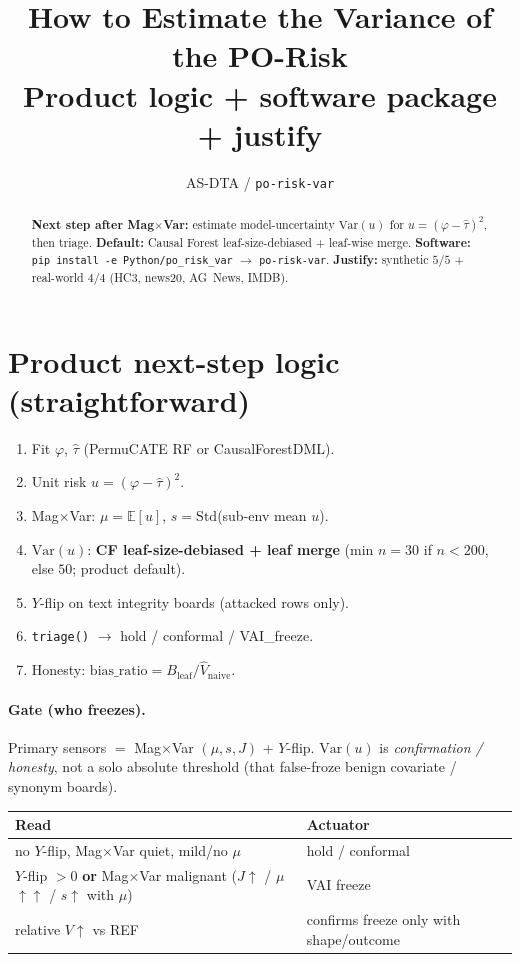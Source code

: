 \documentclass[11pt]{article}
\title{How to Estimate the Variance of the PO-Risk\\
\large Product logic + software package + justify}
\author{AS-DTA / \texttt{po-risk-var}}
\date{}
\begin{document}
\maketitle

\begin{abstract}
\noindent
\textbf{Next step after Mag$\times$Var:} estimate model-uncertainty
$\mathrm{Var}(u)$ for $u=(\varphi-\hat\tau)^2$, then triage.
\textbf{Default:} Causal Forest leaf-size-debiased + leaf-wise merge.
\textbf{Software:} \texttt{pip install -e Python/po\_risk\_var} $\to$
\texttt{po-risk-var}.
\textbf{Justify:} synthetic $5/5$ + real-world $4/4$ (HC3, news20, AG~News, IMDB).
\end{abstract}

\section{Product next-step logic (straightforward)}

\begin{enumerate}[leftmargin=1.3em,itemsep=0.35em]
  \item Fit $\varphi$, $\hat\tau$ (PermuCATE RF or CausalForestDML).
  \item Unit risk $u=(\varphi-\hat\tau)^2$.
  \item Mag$\times$Var: $\mu=\mathbb{E}[u]$, $s=\mathrm{Std}$(sub-env mean $u$).
  \item $\mathrm{Var}(u)$: \textbf{CF leaf-size-debiased + leaf merge}
        (min $n{=}30$ if $n{<}200$, else $50$; product default).
  \item $Y$-flip on text integrity boards (attacked rows only).
  \item \texttt{triage()} $\to$ hold / conformal / VAI\_freeze.
  \item Honesty: $\mathrm{bias\_ratio}=B_{\mathrm{leaf}}/\widehat V_{\mathrm{naive}}$.
\end{enumerate}

\paragraph{Gate (who freezes).}
Primary sensors $=$ Mag$\times$Var $(\mu,s,J)$ + $Y$-flip.
$\mathrm{Var}(u)$ is \emph{confirmation / honesty}, not a solo absolute
threshold (that false-froze benign covariate / synonym boards).
\begin{center}
\small
\begin{tabular}{@{}ll@{}}
\toprule
Read & Actuator \\
\midrule
no $Y$-flip, Mag$\times$Var quiet, mild/no $\mu$ & hold / conformal \\
$Y$-flip $>0$ \textbf{or} Mag$\times$Var malignant
  ($J$$\uparrow$ / $\mu$$\uparrow$$\uparrow$ / $s$$\uparrow$ with $\mu$) & VAI freeze \\
relative $V$$\uparrow$ vs REF & confirms freeze only with shape/outcome \\
\bottomrule
\end{tabular}
\end{center}
\end{document}
